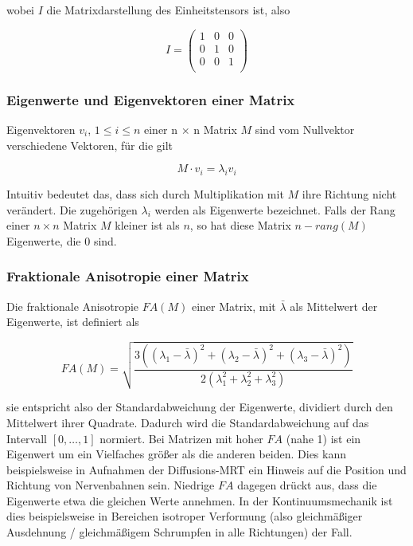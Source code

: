 \documentclass[a4paper,fontsize=12pt,toc=bib,halfparskip]{scrartcl}
\begin{document}
wobei $I$ die Matrixdarstellung des Einheitstensors ist, also

\begin{equation}
	I = 	
	\begin{pmatrix}
		1 & 0 & 0 \\
		0 & 1 & 0 \\
		0 & 0 & 1 \\
	\end{pmatrix}
\end{equation}

\subsubsection{Eigenwerte und Eigenvektoren einer Matrix}

Eigenvektoren $v_i$, $1\leq i\leq n$ einer n $\times$ n Matrix $M$ sind vom Nullvektor verschiedene Vektoren, f\"ur die gilt

\begin{equation}
	M \cdot v_i = \lambda_i v_i
\end{equation}

Intuitiv bedeutet das, dass sich durch Multiplikation mit $M$ ihre Richtung nicht ver\"andert. Die zugeh\"origen $\lambda_i$ werden als Eigenwerte bezeichnet.
Falls der Rang einer $n\times n$ Matrix $M$ kleiner ist als $n$, so hat diese Matrix $n - rang(M)$ Eigenwerte, die 0 sind.

\subsubsection{Fraktionale Anisotropie einer Matrix}
Die fraktionale Anisotropie $FA(M)$ einer Matrix, mit $\bar{\lambda}$ als Mittelwert der Eigenwerte, ist definiert als

\begin{equation}
	FA(M) = \sqrt{\frac{3((\lambda_1 - \bar{\lambda})^2 + (\lambda_2 - \bar{\lambda})^2 + (\lambda_3 - \bar{\lambda})^2)}{2(\lambda_1^2 + \lambda_2^2 + \lambda_3^2)}}
\end{equation}

sie entspricht also der Standardabweichung der Eigenwerte, dividiert durch den Mittelwert ihrer Quadrate. Dadurch wird die Standardabweichung auf das Intervall $[0,\dots,1]$ normiert. Bei Matrizen mit hoher $FA$ (nahe 1) ist ein Eigenwert um ein Vielfaches gr\"o{\ss}er als die anderen beiden. Dies kann beispielsweise in Aufnahmen der Diffusions-MRT ein Hinweis auf die Position und Richtung von Nervenbahnen sein. Niedrige $FA$ dagegen dr\"uckt aus, dass die Eigenwerte etwa die gleichen Werte annehmen. In der Kontinuumsmechanik ist dies beispielsweise in Bereichen isotroper Verformung (also gleichm\"a{\ss}iger Ausdehnung / gleichm\"a{\ss}igem Schrumpfen in alle Richtungen) der Fall.
\end{document}
